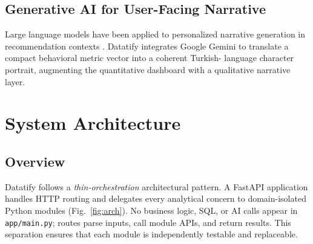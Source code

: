 \documentclass[conference]{IEEEtran}
\begin{document}
\subsection{Generative AI for User-Facing Narrative}

Large language models have been applied to personalized narrative generation
in recommendation contexts \cite{li2023gpt4rec}. Datatify integrates Google
Gemini to translate a compact behavioral metric vector into a coherent Turkish-
language character portrait, augmenting the quantitative dashboard with a
qualitative narrative layer.

\section{System Architecture}

\subsection{Overview}

Datatify follows a \emph{thin-orchestration} architectural pattern. A FastAPI
application handles HTTP routing and delegates every analytical concern to
domain-isolated Python modules (Fig.~\ref{fig:arch}). No business logic,
SQL, or AI calls appear in \texttt{app/main.py}; routes parse inputs, call
module APIs, and return results. This separation ensures that each module
is independently testable and replaceable.
\end{document}
